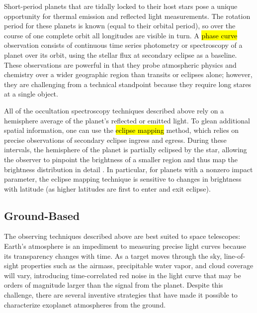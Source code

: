 \documentclass[graybox,natbib,nosecnum]{svmult}
\newcommand{\hbindex}[1]{\hl{#1}\index{#1}}  %
\begin{document}
Short-period planets that are tidally locked to their host stars pose a unique opportunity for thermal emission and reflected light measurements. The rotation period for these planets is known (equal to their orbital period), so over the course of one complete orbit all longitudes are visible in turn. A \hbindex{phase curve} observation consists of continuous time series photometry or spectroscopy of a planet over its orbit, using the stellar flux at secondary eclipse as a baseline. These observations are powerful in that they probe atmospheric physics and chemistry over a wider geographic region than transits or eclipses alone; however, they are challenging from a technical standpoint because they require long stares at a single object. %

All of the occultation spectroscopy techniques described above rely on a hemisphere average of the planet's reflected or emitted light. To glean additional spatial information, one can use the \hbindex{eclipse mapping} method, which relies on precise observations of secondary eclipse ingress and egress.  During these intervals, the hemisphere of the planet is partially eclipsed by the star, allowing the observer to pinpoint the brightness of a smaller region and thus map the brightness distribution in detail \citep{rauscher07}. In particular, for planets with a nonzero impact parameter, the eclipse mapping technique is sensitive to changes in brightness with latitude (as higher latitudes are first to enter and exit eclipse). 

\subsection{Ground-Based}
The observing techniques described above are best suited to space telescopes: Earth's atmosphere is an impediment to measuring precise light curves because its transparency changes with time.  As a target moves through the sky, line-of-sight properties such as the airmass, precipitable water vapor, and cloud coverage will vary, introducing time-correlated red noise in the light curve that may be orders of magnitude larger than the signal from the planet. Despite this challenge, there are several inventive strategies that have made it possible to characterize exoplanet atmospheres from the ground. 
\end{document}
